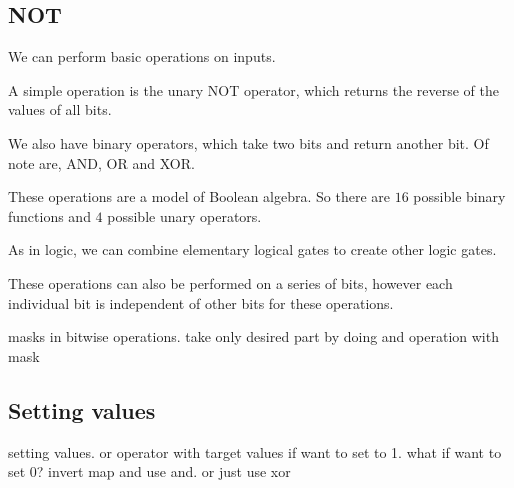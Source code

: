 
\subsection{NOT}

We can perform basic operations on inputs.

A simple operation is the unary NOT operator, which returns the reverse of the values of all bits.

We also have binary operators, which take two bits and return another bit. Of note are, AND, OR and XOR.

These operations are a model of Boolean algebra. So there are \(16\) possible binary functions and \(4\) possible unary operators.

As in logic, we can combine elementary logical gates to create other logic gates.

These operations can also be performed on a series of bits, however each individual bit is independent of other bits for these operations.



masks in bitwise operations. take only desired part by doing and operation with mask

\subsection{Setting values}

setting values. or operator with target values if want to set to 1.
what if want to set 0? invert map and use and. or just use xor



